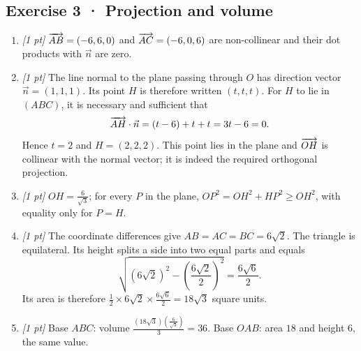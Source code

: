 \subsection*{Exercise 3 · Projection and volume}\begin{enumerate}

\item \textit{[1 pt]} $\overrightarrow{AB}=(-6,6,0)$ and $\overrightarrow{AC}=(-6,0,6)$ are non-collinear and their dot products with $\vec n$ are zero.

\item \textit{[1 pt]} The line normal to the plane passing through $O$ has direction vector $\vec n=(1,1,1)$. Its point $H$ is therefore written $(t,t,t)$. For $H$ to lie in $(ABC)$, it is necessary and sufficient that
\[\overrightarrow{AH}\cdot\vec n=(t-6)+t+t=3t-6=0.\]
Hence $t=2$ and $H=(2,2,2)$. This point lies in the plane and $\overrightarrow{OH}$ is collinear with the normal vector; it is indeed the required orthogonal projection.

\item \textit{[1 pt]} $OH=\frac{6}{\sqrt{3}}$; for every $P$ in the plane, $OP^2=OH^2+HP^2\ge OH^2$, with equality only for $P=H$.

\item \textit{[1 pt]} The coordinate differences give $AB=AC=BC=6\sqrt2$. The triangle is equilateral. Its height splits a side into two equal parts and equals
\[\sqrt{(6\sqrt2)^2-(\frac{6\sqrt{2}}{2})^2}=\frac{6\sqrt6}{2}.\]
Its area is therefore $\frac12\times 6\sqrt2\times\frac{6\sqrt6}{2}=18\sqrt3$ square units.

\item \textit{[1 pt]} Base $ABC$: volume $\frac{(18\sqrt3)(\frac{6}{\sqrt{3}})}{3}=36$. Base $OAB$: area $18$ and height $6$, the same value.

\end{enumerate}

